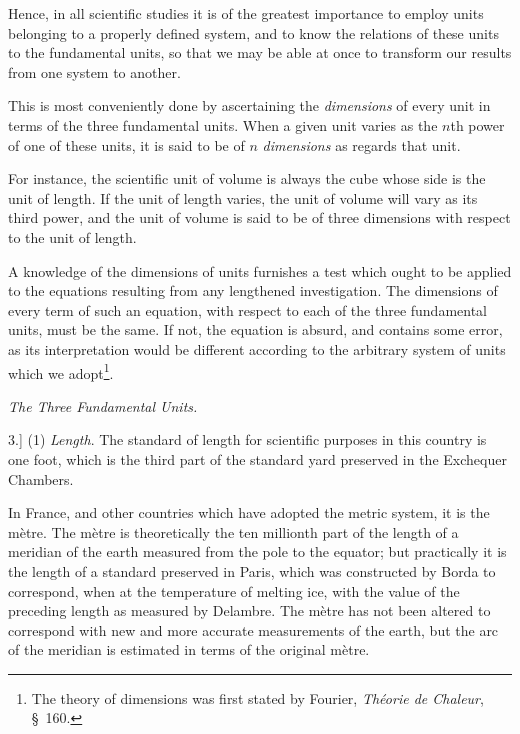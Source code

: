 \documentclass[11pt,a4paper]{article}
\begin{document}
Hence, in all scientific studies it is of the greatest importance to
employ units belonging to a properly defined system, and to know the
relations of these units to the fundamental units, so that we may be
able at once to transform our results from one system to another.

This is most conveniently done by ascertaining the \textit{dimensions}
of every unit in terms of the three fundamental units. When a given unit
varies as the \(n\)th power of one of these units, it is said to be of
\(n\) \textit{dimensions} as regards that unit.

For instance, the scientific unit of volume is always the cube whose side
is the unit of length. If the unit of length varies, the unit of volume
will vary as its third power, and the unit of volume is said to be of
three dimensions with respect to the unit of length.

A knowledge of the dimensions of units furnishes a test which ought to
be applied to the equations resulting from any lengthened investigation.
The dimensions of every term of such an equation, with respect to each of
the three fundamental units, must be the same. If not, the equation is
absurd, and contains some error, as its interpretation would be different
according to the arbitrary system of units which we adopt\footnote{The
theory of dimensions was first stated by Fourier, \textit{Théorie de
Chaleur}, \S\ 160.}.

\begin{center}
\textit{The Three Fundamental Units.}
\end{center}

3.] (1) \textit{Length}. The standard of length for scientific purposes
in this country is one foot, which is the third part of the standard yard
preserved in the Exchequer Chambers.

In France, and other countries which have adopted the metric system, it
is the mètre. The mètre is theoretically the ten millionth part of the
length of a meridian of the earth measured from the pole to the equator;
but practically it is the length of a standard preserved in Paris, which
was constructed by Borda to correspond, when at the temperature of
melting ice, with the value of the preceding length as measured by
Delambre. The mètre has not been altered to correspond with new and more
accurate measurements of the earth, but the arc of the meridian is
estimated in terms of the original mètre.

\clearpage
\end{document}
